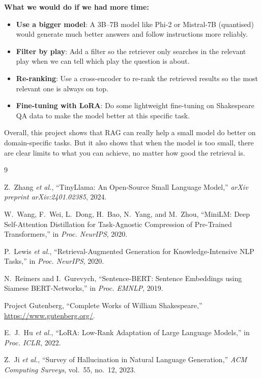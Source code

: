 \documentclass[10pt,conference]{IEEEtran}
\begin{document}
\textbf{What we would do if we had more time:}
\begin{itemize}
    \item \textbf{Use a bigger model}: A 3B--7B model like Phi-2 or Mistral-7B (quantised) would generate much better answers and follow instructions more reliably.
    \item \textbf{Filter by play}: Add a filter so the retriever only searches in the relevant play when we can tell which play the question is about.
    \item \textbf{Re-ranking}: Use a cross-encoder to re-rank the retrieved results so the most relevant one is always on top.
    \item \textbf{Fine-tuning with LoRA}: Do some lightweight fine-tuning on Shakespeare QA data to make the model better at this specific task.
\end{itemize}

Overall, this project shows that RAG can really help a small model do better on domain-specific tasks. But it also shows that when the model is too small, there are clear limits to what you can achieve, no matter how good the retrieval is.

\begin{thebibliography}{9}

Z.~Zhang \textit{et al.}, ``TinyLlama: An Open-Source Small Language Model,'' \textit{arXiv preprint arXiv:2401.02385}, 2024.

W.~Wang, F.~Wei, L.~Dong, H.~Bao, N.~Yang, and M.~Zhou, ``MiniLM: Deep Self-Attention Distillation for Task-Agnostic Compression of Pre-Trained Transformers,'' in \textit{Proc. NeurIPS}, 2020.

P.~Lewis \textit{et al.}, ``Retrieval-Augmented Generation for Knowledge-Intensive NLP Tasks,'' in \textit{Proc. NeurIPS}, 2020.

N.~Reimers and I.~Gurevych, ``Sentence-BERT: Sentence Embeddings using Siamese BERT-Networks,'' in \textit{Proc. EMNLP}, 2019.

Project Gutenberg, ``Complete Works of William Shakespeare,'' \url{https://www.gutenberg.org/}.

E.~J.~Hu \textit{et al.}, ``LoRA: Low-Rank Adaptation of Large Language Models,'' in \textit{Proc. ICLR}, 2022.

Z.~Ji \textit{et al.}, ``Survey of Hallucination in Natural Language Generation,'' \textit{ACM Computing Surveys}, vol.~55, no.~12, 2023.

\end{thebibliography}
\end{document}
